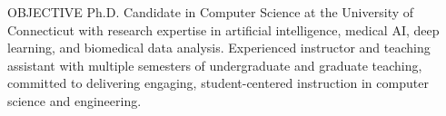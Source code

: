 %


\vspace{-1em}
\begin{rSection}{OBJECTIVE}
{
Ph.D. Candidate in Computer Science at the University of Connecticut with research expertise in artificial intelligence, medical AI, deep learning, and biomedical data analysis. Experienced instructor and teaching assistant with multiple semesters of undergraduate and graduate teaching, committed to delivering engaging, student-centered instruction in computer science and engineering.
}
\end{rSection}

